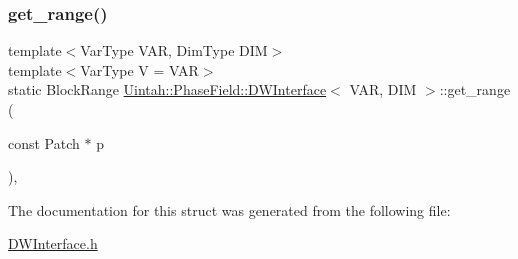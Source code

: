 \mbox{\label{structUintah_1_1PhaseField_1_1DWInterface_aaf163a6173f0ed2d092bb7d2d6b18a21}} 
\subsubsection{\texorpdfstring{get\+\_\+range()}{get\_range()}}
{\footnotesize\ttfamily template$<$Var\+Type V\+AR, Dim\+Type D\+IM$>$ \\
template$<$Var\+Type V = V\+AR$>$ \\
static Block\+Range \hyperlink{structUintah_1_1PhaseField_1_1DWInterface}{Uintah\+::\+Phase\+Field\+::\+D\+W\+Interface}$<$ V\+AR, D\+IM $>$\+::get\+\_\+range (\begin{DoxyParamCaption}\item[{const Patch $\ast$}]{p }\end{DoxyParamCaption})\hspace{0.3cm}{\ttfamily [inline]}, {\ttfamily [static]}}



The documentation for this struct was generated from the following file\+:\begin{DoxyCompactItemize}
\item 
\hyperlink{DWInterface_8h}{D\+W\+Interface.\+h}\end{DoxyCompactItemize}
